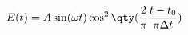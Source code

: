 
\begin{equation}
E(t) = A \sin(\omega t)\cos^2\qty(\frac{2}{\pi}\frac{t - t_0}{\pi \Delta t})
\end{equation}
